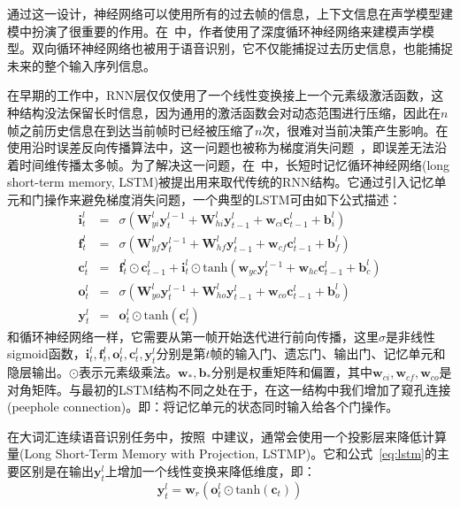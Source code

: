 通过这一设计，神经网络可以使用所有的过去帧的信息，上下文信息在声学模型建模中扮演了很重要的作用。在~\cite{graves2013hybrid,graves2013speech,sak2014long,sak2014sequence}中，作者使用了深度循环神经网络来建模声学模型。双向循环神经网络也被用于语音识别，它不仅能捕捉过去历史信息，也能捕捉未来的整个输入序列信息。

在早期的工作中，RNN层仅仅使用了一个线性变换接上一个元素级激活函数，这种结构没法保留长时信息，因为通用的激活函数会对动态范围进行压缩，因此在$n$帧之前历史信息在到达当前帧时已经被压缩了$n$次，很难对当前决策产生影响。在使用沿时误差反向传播算法中，这一问题也被称为梯度消失问题~\cite{bengio1994learning}，即误差无法沿着时间维传播太多帧。为了解决这一问题，在~\cite{hochreiter1997long}中，长短时记忆循环神经网络(long short-term memory, LSTM)被提出用来取代传统的RNN结构。它通过引入记忆单元和门操作来避免梯度消失问题，一个典型的LSTM可由如下公式描述：
\begin{eqnarray}
    \label{eq:lstm}
    \mathbf{i}^l_t &=& \sigma( \mathbf{W}^l_{yi} \mathbf{y}^{l-1}_t + \mathbf{W}^l_{hi} \mathbf{y}^l_{t-1} + \mathbf{w}_{ci} \mathbf{c}^l_{t-1} + \mathbf{b}^l_i) \\
    \mathbf{f}^l_t &=& \sigma( \mathbf{W}^l_{yf} \mathbf{y}^{l-1}_t + \mathbf{W}^l_{hf} \mathbf{y}^l_{t-1} + \mathbf{w}_{cf} \mathbf{c}^l_{t-1} + \mathbf{b}^l_f) \\
    \mathbf{c}^l_t &=& \mathbf{f}^l_t \odot \mathbf{c}^l_{t-1} + \mathbf{i}^l_t \odot \text{tanh}(\mathbf{w}_{yc} \mathbf{y}^{l-1}_t + \mathbf{w}_{hc} \mathbf{c}^l_{t-1} + \mathbf{b}^l_c) \\
    \mathbf{o}^l_t &=& \sigma( \mathbf{W}^l_{yo} \mathbf{y}^{l-1}_t + \mathbf{W}^l_{ho} \mathbf{y}^l_{t-1} + \mathbf{w}_{co} \mathbf{c}^l_{t-1} + \mathbf{b}^l_o) \\
    \mathbf{y}^l_t &=& \mathbf{o}^l_t \odot \text{tanh}(\mathbf{c}^l_t)
\end{eqnarray}
和循环神经网络一样，它需要从第一帧开始迭代进行前向传播，这里$\sigma$是非线性sigmoid函数，$\mathbf{i}^l_t, \mathbf{f}^l_t, \mathbf{o}^l_t, \mathbf{c}^l_t, \mathbf{y}^l_t$分别是第$t$帧的输入门、遗忘门、输出门、记忆单元和隐层输出。$\odot$表示元素级乘法。$\mathbf{w}_*, \mathbf{b}_*$分别是权重矩阵和偏置，其中$\mathbf{w}_{ci}, \mathbf{w}_{cf}, \mathbf{w}_{co}$是对角矩阵。与最初的LSTM结构不同之处在于，在这一结构中我们增加了窥孔连接(peephole connection)。即：将记忆单元的状态同时输入给各个门操作。

在大词汇连续语音识别任务中，按照~\cite{sak2014long}中建议，通常会使用一个投影层来降低计算量(Long Short-Term Memory with Projection, LSTMP)。它和公式~\ref{eq:lstm}的主要区别是在输出$\mathbf{y}^l_t$上增加一个线性变换来降低维度，即：
\begin{equation}
    \mathbf{y}^l_t = \mathbf{w}_{r} ( \mathbf{o}^l_t \odot \text{tanh}(\mathbf{c}_t) )
\end{equation}

